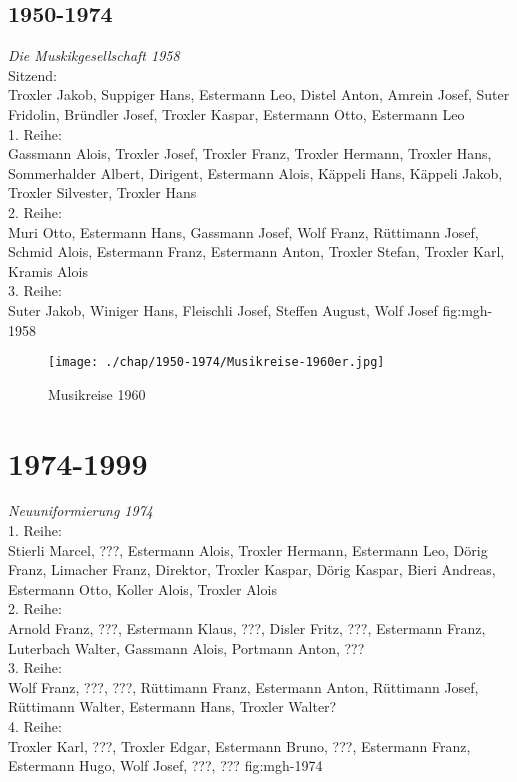 \documentclass[]{book}
\begin{document}
\section{1950-1974}

{\emph{Die Muskikgesellschaft 1958}\\
    Sitzend:\\
    Troxler Jakob, Suppiger Hans, Estermann Leo, Distel Anton, Amrein Josef,
    Suter Fridolin, Bründler Josef, Troxler Kaspar, Estermann Otto, Estermann
    Leo\\
    1. Reihe:\\
    Gassmann Alois, Troxler Josef, Troxler Franz, Troxler Hermann, Troxler Hans,
    Sommerhalder Albert, Dirigent, Estermann Alois, Käppeli Hans, Käppeli Jakob,
    Troxler Silvester, Troxler Hans\\
    2. Reihe:\\
    Muri Otto, Estermann Hans, Gassmann Josef, Wolf Franz, Rüttimann Josef,
    Schmid Alois, Estermann Franz, Estermann Anton, Troxler Stefan, Troxler
    Karl, Kramis Alois\\
    3. Reihe:\\
    Suter Jakob, Winiger Hans, Fleischli Josef, Steffen August, Wolf Josef }
{fig:mgh-1958}


\begin{figure}[ht]
    \centering
    \texttt{[image: ./chap/1950-1974/Musikreise-1960er.jpg]}
    \label{fig:mgh-musigreise-1960}
    \caption{Musikreise 1960}
\end{figure}
\clearpage

\chapter{1974-1999}

{\emph{Neuuniformierung 1974}\\
    1. Reihe:\\
    Stierli Marcel, ???, Estermann Alois, Troxler Hermann, Estermann Leo, Dörig
    Franz, Limacher Franz, Direktor, Troxler Kaspar, Dörig Kaspar, Bieri
    Andreas, Estermann Otto, Koller Alois, Troxler Alois\\
    2. Reihe:\\
    Arnold Franz, ???, Estermann Klaus, ???, Disler Fritz, ???, Estermann Franz,
    Luterbach Walter, Gassmann Alois, Portmann Anton, ???\\
    3. Reihe:\\
    Wolf Franz, ???, ???, Rüttimann Franz, Estermann Anton, Rüttimann Josef,
    Rüttimann Walter, Estermann Hans, Troxler Walter?\\
    4. Reihe:\\
    Troxler Karl, ???, Troxler Edgar, Estermann Bruno, ???, Estermann Franz,
    Estermann Hugo, Wolf Josef, ???, ??? } {fig:mgh-1974}
\end{document}
